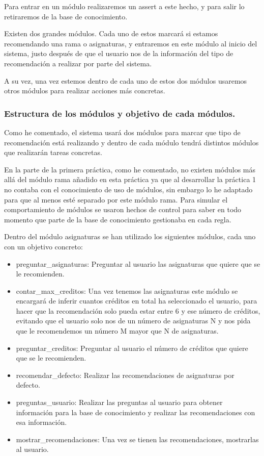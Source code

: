 \documentclass[12pt, spanish]{article}
\begin{document}
Para entrar en un módulo realizaremos un assert a este hecho, y para salir lo retiraremos de la base de conocimiento.

Existen dos grandes módulos. Cada uno de estos marcará si estamos recomendando una rama o asignaturas, y entraremos en este módulo al inicio del sistema, justo después de que el usuario nos de la información del tipo de recomendación a realizar por parte del sistema.

A su vez, una vez estemos dentro de cada uno de estos dos módulos usaremos otros módulos para realizar acciones más concretas.

\subsubsection{Estructura de los módulos y objetivo de cada módulos.}

Como he comentado, el sistema usará dos módulos para marcar que tipo de recomendación está realizando y dentro de cada módulo tendrá distintos módulos que realizarán tareas concretas.

En la parte de la primera práctica, como he comentado, no existen módulos más allá del módulo rama añadido en esta práctica ya que al desarrollar la práctica 1 no contaba con el conocimiento de uso de módulos, sin embargo lo he adaptado para que al menos esté separado por este módulo rama. Para simular el comportamiento de módulos se usaron hechos de control para saber en todo momento que parte de la base de conocimiento gestionaba en cada regla.

Dentro del módulo asignaturas se han utilizado los siguientes módulos, cada uno con un objetivo concreto:

\begin{itemize}
	\item  preguntar\_asignaturas: Preguntar al usuario las asignaturas que quiere que se le recomienden.
	\item contar\_max\_creditos: Una vez tenemos las asignaturas este módulo se encargará de inferir cuantos créditos en total ha seleccionado el usuario, para hacer que la recomendación solo pueda estar entre 6 y ese número de créditos, evitando que el usuario solo nos de un número de asignaturas N y nos pida que le recomendemos un número M mayor que N de asignaturas.
	\item preguntar\_creditos: Preguntar al usuario el número de créditos que quiere que se le recomienden.
	\item recomendar\_defecto: Realizar las recomendaciones de asignaturas por defecto.
	\item preguntas\_usuario: Realizar las preguntas al usuario para obtener información para la base de conocimiento y realizar las recomendaciones con esa información.
	\item mostrar\_recomendaciones: Una vez se tienen las recomendaciones, mostrarlas al usuario.
\end{itemize}
\end{document}
